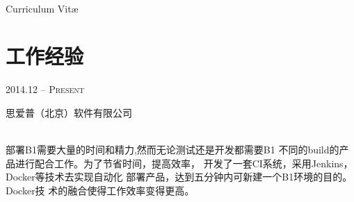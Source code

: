 \documentclass[10pt]{article} %
\begin{document}
\color{text1} %


\par{\\ %
{\color{headings} Curriculum {Vit\ae}\\[15pt]\par} %
	

\begin{minipage}[t]{0.5\textwidth} %
\vspace{0pt} %
	

\section{工作经验} 


{\raggedleft\textsc{2014.12 -- Present}\par}

{\raggedright\large 思爱普（北京）软件有限公司\\[8pt] 

\\[8pt]}

\normalsize{
部署B1需要大量的时间和精力,然而无论测试还是开发都需要B1
不同的build的产品进行配合工作。为了节省时间，提高效率，
开发了一套CI系统，采用Jenkins，Docker等技术去实现自动化
部署产品，达到五分钟内可新建一个B1环境的目的。Docker技
术的融合使得工作效率变得更高。}\\



\end{minipage}}
\end{document}
